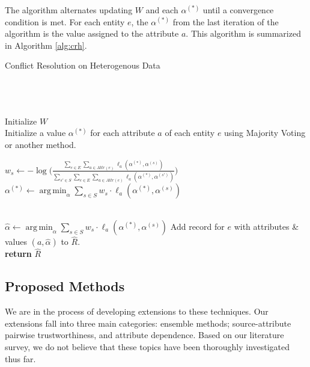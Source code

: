 \documentclass{acm_proc_article-sp}
\DeclareMathOperator*{\argmin}{arg\,min}
\begin{document}
The algorithm alternates updating $W$ and each $\alpha^{(*)}$ until a convergence condition is met. For each entity $e$, the $\alpha^{(*)}$ from the last iteration of the algorithm is the value assigned to the attribute $a$. This algorithm is summarized in Algorithm \ref{alg:crh}. 


\begin{algorithm}
\small
\caption{Conflict Resolution on Heterogenous Data}
\begin{algorithmic}[1]
 \\
 \\
 \\

\State Initialize $W$ \\

\State Initialize a value $\alpha^{(*)}$ for each attribute $a$ of each entity $e$ using Majority Voting or another method. 

\State $w_s \leftarrow - \log \big ( \frac{\sum_{e \in E} \sum_{a \in Attr(e)} \ell_a(\alpha^{(*)}, \alpha^{(s)})}{\sum_{s' \in S} \sum_{e \in E}  \sum_{a \in Attr(e)} \ell_a(\alpha^{(*)}, \alpha^{(s')})} \big )$
\State $\alpha^{(*)} \leftarrow \argmin_\alpha \sum_{s \in S} w_s \cdot \ell_a(\alpha^{(*)}, \alpha^{(s)})$
\EndFor
\EndFor
\EndWhile

\\

\State $\hat{\alpha} \leftarrow \argmin_\alpha \sum_{s \in S} w_s \cdot \ell_a(\alpha^{(*)}, \alpha^{(s)})$
\EndFor
\State Add record for $e$ with attributes \& values $(a, \hat{\alpha})$ to $\hat{R}$.
\EndFor
\\

\State \textbf{return} $\hat{R}$
\EndFunction
\end{algorithmic}
\label{alg:crh}
\end{algorithm}  


\subsection{Proposed Methods}

We are in the process of developing extensions to these techniques. Our extensions fall into three main categories: ensemble methods; source-attribute pairwise trustworthiness, and attribute dependence. Based on our literature survey, we do not believe that these topics have been thoroughly investigated thus far. 
\end{document}
